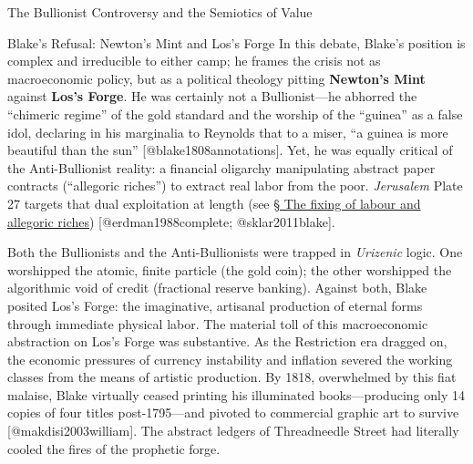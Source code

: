 \documentclass[
  ignorenonframetext,
]{beamer}
\begin{document}
\begin{frame}{The Bullionist Controversy and the Semiotics of Value}
\begin{block}{Blake's Refusal: Newton's Mint and Los's Forge}
\protect{}\label{blakes-refusal-newtons-mint-and-loss-forge}
In this debate, Blake's position is complex and irreducible to either
camp; he frames the crisis not as macroeconomic policy, but as a
political theology pitting \textbf{Newton's Mint} against \textbf{Los's
Forge}. He was certainly not a Bullionist---he abhorred the ``chimeric
regime'' of the gold standard and the worship of the ``guinea'' as a
false idol, declaring in his marginalia to Reynolds that to a miser, ``a
guinea is more beautiful than the sun'' {[}@blake1808annotations{]}.
Yet, he was equally critical of the Anti-Bullionist reality: a financial
oligarchy manipulating abstract paper contracts (``allegoric riches'')
to extract real labor from the poor. \emph{Jerusalem} Plate 27 targets
that dual exploitation at length (see \hyperlink{sec-allegoric-riches}{§
The fixing of labour and allegoric riches}) {[}@erdman1988complete;
@sklar2011blake{]}.

Both the Bullionists and the Anti-Bullionists were trapped in
\emph{Urizenic} logic. One worshipped the atomic, finite particle (the
gold coin); the other worshipped the algorithmic void of credit
(fractional reserve banking). Against both, Blake posited Los's Forge:
the imaginative, artisanal production of eternal forms through immediate
physical labor. The material toll of this macroeconomic abstraction on
Los's Forge was substantive. As the Restriction era dragged on, the
economic pressures of currency instability and inflation severed the
working classes from the means of artistic production. By 1818,
overwhelmed by this fiat malaise, Blake virtually ceased printing his
illuminated books---producing only 14 copies of four titles
post-1795---and pivoted to commercial graphic art to survive
{[}@makdisi2003william{]}. The abstract ledgers of Threadneedle Street
had literally cooled the fires of the prophetic forge.


\end{block}
\end{frame}
\end{document}
